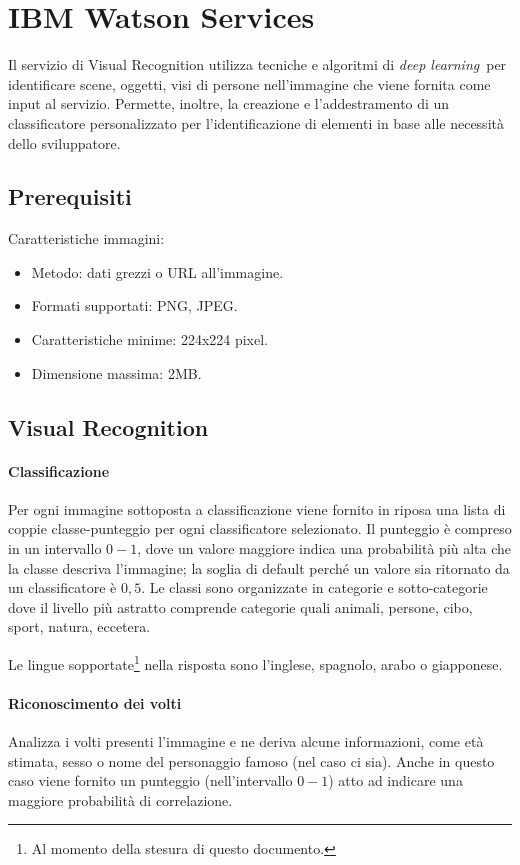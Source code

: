 
\section{IBM Watson Services}
Il servizio di Visual Recognition\cite{ibm-api} utilizza tecniche e algoritmi di \textit{deep learning} per identificare scene, oggetti, visi di persone nell'immagine che viene fornita come input al servizio. Permette, inoltre, la creazione e l'addestramento di un classificatore personalizzato per l'identificazione di elementi in base alle necessità dello sviluppatore.

\subsection{Prerequisiti}
Caratteristiche immagini:
\begin{itemize}
\item Metodo: dati grezzi o URL all'immagine.
\item Formati supportati: PNG, JPEG.
\item Caratteristiche minime: 224x224 pixel.
\item Dimensione massima: 2MB.
\end{itemize}


\subsection{Visual Recognition}
\paragraph{Classificazione} Per ogni immagine sottoposta a classificazione viene fornito in riposa una lista di coppie classe-punteggio per ogni classificatore selezionato. Il punteggio è compreso in un intervallo $0-1$, dove un valore maggiore indica una probabilità più alta che la classe descriva l'immagine; la soglia di default perché un valore sia ritornato da un classificatore è $0,5$.
Le classi sono organizzate in categorie e sotto-categorie dove il livello più astratto comprende categorie quali animali, persone, cibo, sport, natura, eccetera.

Le lingue sopportate\footnote{Al momento della stesura di questo documento.} nella risposta sono l'inglese, spagnolo, arabo o giapponese.

\paragraph{Riconoscimento dei volti} Analizza i volti presenti l'immagine e ne deriva alcune informazioni, come età stimata, sesso o nome del personaggio famoso (nel caso ci sia). Anche in questo caso viene fornito un punteggio (nell'intervallo $0-1$) atto ad indicare una maggiore probabilità di correlazione.

